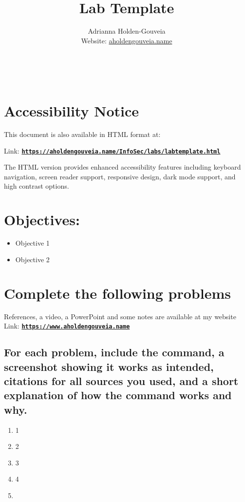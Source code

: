 \documentclass[12pt]{article}
\title{Lab Template}
\author{
        Adrianna Holden-Gouveia \\
        Website: \href{https://aholdengouveia.name}{aholdengouveia.name}\\ 
        \date{\vspace{-5ex}}
        \faGithub {: aholdengouveia} \\
        \faTwitter {: aholdengouveia} \\
        }
\begin{document}
    

\maketitle

\section*{Accessibility Notice}
This document is also available in HTML format at:

Link: \href{https://aholdengouveia.name/InfoSec/labs/labtemplate.html}{\textbf{\nolinkurl{https://aholdengouveia.name/InfoSec/labs/labtemplate.html}}}

The HTML version provides enhanced accessibility features including keyboard navigation, screen reader support, responsive design, dark mode support, and high contrast options.



\section*{Objectives:}
\begin{itemize}
    \item Objective 1
    \item Objective 2
\end{itemize}
\section*{Complete the following problems}

References, a video, a PowerPoint and some notes are available at my website
Link: \href{https://www.aholdengouveia.name}{\textbf{\nolinkurl{https://www.aholdengouveia.name}}}

\subsection*{For each problem, include the command, a screenshot showing it works as intended, citations for all sources you used, and a short explanation of how the command works and why.}
    \begin{enumerate}
        \item 1
        \item 2
        \item 3
        \item 4
        \item 


    \end{enumerate}
\end{document}

